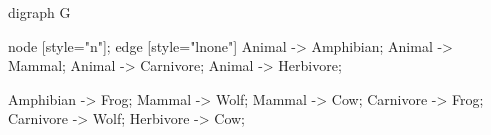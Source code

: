 digraph G {
    node [style="n"];
    edge [style="lnone"]
    Animal -> Amphibian;
    Animal -> Mammal;
    Animal -> Carnivore;
    Animal -> Herbivore;

    Amphibian -> Frog;
    Mammal -> Wolf;
    Mammal -> Cow;
    Carnivore -> Frog;
    Carnivore -> Wolf;
    Herbivore -> Cow;
}
